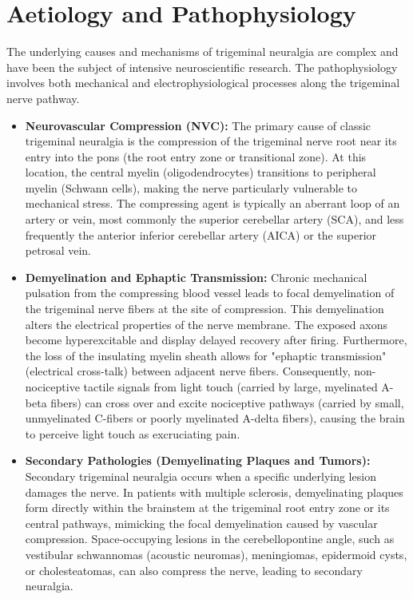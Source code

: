 \section*{Aetiology and Pathophysiology}
The underlying causes and mechanisms of trigeminal neuralgia are complex and have been the subject of intensive neuroscientific research. The pathophysiology involves both mechanical and electrophysiological processes along the trigeminal nerve pathway.
\begin{itemize}
  \item \textbf{Neurovascular Compression (NVC):} The primary cause of classic trigeminal neuralgia is the compression of the trigeminal nerve root near its entry into the pons (the root entry zone or transitional zone). At this location, the central myelin (oligodendrocytes) transitions to peripheral myelin (Schwann cells), making the nerve particularly vulnerable to mechanical stress. The compressing agent is typically an aberrant loop of an artery or vein, most commonly the superior cerebellar artery (SCA), and less frequently the anterior inferior cerebellar artery (AICA) or the superior petrosal vein.
  \item \textbf{Demyelination and Ephaptic Transmission:} Chronic mechanical pulsation from the compressing blood vessel leads to focal demyelination of the trigeminal nerve fibers at the site of compression. This demyelination alters the electrical properties of the nerve membrane. The exposed axons become hyperexcitable and display delayed recovery after firing. Furthermore, the loss of the insulating myelin sheath allows for "ephaptic transmission" (electrical cross-talk) between adjacent nerve fibers. Consequently, non-nociceptive tactile signals from light touch (carried by large, myelinated A-beta fibers) can cross over and excite nociceptive pathways (carried by small, unmyelinated C-fibers or poorly myelinated A-delta fibers), causing the brain to perceive light touch as excruciating pain.
  \item \textbf{Secondary Pathologies (Demyelinating Plaques and Tumors):} Secondary trigeminal neuralgia occurs when a specific underlying lesion damages the nerve. In patients with multiple sclerosis, demyelinating plaques form directly within the brainstem at the trigeminal root entry zone or its central pathways, mimicking the focal demyelination caused by vascular compression. Space-occupying lesions in the cerebellopontine angle, such as vestibular schwannomas (acoustic neuromas), meningiomas, epidermoid cysts, or cholesteatomas, can also compress the nerve, leading to secondary neuralgia.

\end{itemize}
